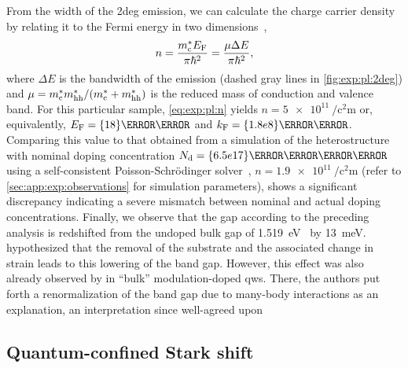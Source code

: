 From the width of the \gls{2deg} emission, we can calculate the charge carrier density by relating it to the Fermi energy in two dimensions~\cite{Pinczuk1984,Ihn2009},
\begin{equation}\label{eq:exp:pl:n}
    n = \frac{m^{\ast}_{\mathrm{c}}E_{\mathrm{F}}}{\pi\hbar^2} = \frac{\mu\Delta E}{\pi\hbar^2},
\end{equation}
where $\Delta E$ is the bandwidth of the emission (dashed gray lines in \cref{fig:exp:pl:2deg}) and $\mu = m^{\ast}_{\mathrm{c}}m^{\ast}_{\mathrm{hh}}/(m^{\ast}_{\mathrm{c}} + m^{\ast}_{\mathrm{hh}})$ is the reduced mass of conduction and valence band.
For this particular sample, \cref{eq:exp:pl:n} yields $n = \qty{5e11}{\per\square\centi\meter}$ or, equivalently, $E_{\mr{F}} = \qty{18}{\milli\electronvolt}$ and $k_{\mr{F}} = \qty{1.8e8}{\per\meter}$.
Comparing this value to that obtained from a simulation of the heterostructure with nominal doping concentration $N_{\mr{d}} = \qty{6.5e17}{\per\cubic\centi\meter}$ using a self-consistent Poisson-Schrödinger solver~\cite{PoissonSchroedinger}, $n = \qty{1.9e11}{\per\square\centi\meter}$ (refer to \cref{sec:app:exp:observations} for simulation parameters), shows a significant discrepancy indicating a severe mismatch between nominal and actual doping concentrations.
Finally, we observe that the gap according to the preceding analysis is redshifted from the undoped bulk gap of \qty{1.519}{\electronvolt}~\cite{Vurgaftman2001} by \qty{13}{\milli\electronvolt}.
 hypothesized that the removal of the  substrate and the associated change in strain leads to this lowering of the band gap.
However, this effect was also already observed by \citet{Pinczuk1984} in \enquote{bulk} modulation-doped  \glspl{qw}.
There, the authors put forth a renormalization of the band gap due to many-body interactions as an explanation, an interpretation since well-agreed upon~\cite{Jain1992}

\subsection{Quantum-confined Stark shift}\label{subsec:exp:observations:pl:qcse}

